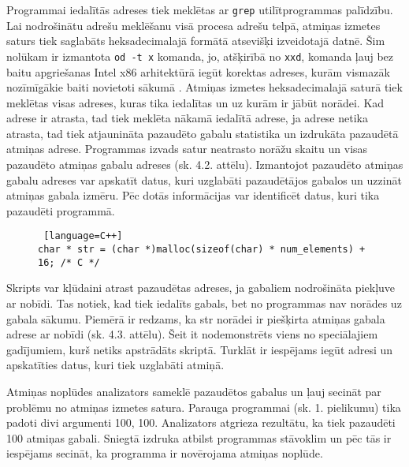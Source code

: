 Programmai iedalītās adreses tiek meklētas ar \texttt{grep} utilītprogrammas palīdzību.
Lai nodrošinātu adrešu meklēšanu visā procesa adrešu telpā, atmiņas izmetes saturs tiek saglabāts heksadecimalajā formātā atsevišķi izveidotajā datnē.
Šim nolūkam ir izmantota \texttt{od -t x} komanda, jo, atšķirībā no \texttt{xxd}, komanda ļauj bez baitu apgriešanas Intel x86 arhitektūrā iegūt korektas adreses, kurām  vismazāk nozīmīgākie baiti novietoti sākumā \cite{DPT}.
Atmiņas izmetes heksadecimalajā saturā tiek meklētas visas adreses, kuras tika iedalītas un uz kurām ir jābūt norādei.
Kad adrese ir atrasta, tad tiek meklēta nākamā iedalītā adrese, ja adrese netika atrasta, tad tiek atjaunināta pazaudēto gabalu statistika un izdrukāta pazaudētā atmiņas adrese.
Programmas izvads satur neatrasto norāžu skaitu un visas pazaudēto atmiņas gabalu adreses (sk. 4.2. attēlu).
Izmantojot pazaudēto atmiņas gabalu adreses var apskatīt datus, kuri uzglabāti pazaudētājos gabalos un uzzināt atmiņas gabala izmēru.
Pēc dotās informācijas var identificēt datus, kuri tika pazaudēti programmā.


\begin{figure}[h]
\begin{lstlisting} [language=C++]
char * str = (char *)malloc(sizeof(char) * num_elements) + 16; /* C */
\end{lstlisting}
\caption{\textbf{\fontsize{11}{12}\selectfont {Speciālgadījums - procesa adrešu telpā nav norādes uz gabala sākumu}}}
\end{figure}


Skripts var kļūdaini atrast pazaudētas adreses, ja gabaliem nodrošināta piekļuve ar nobīdi.
Tas notiek, kad tiek iedalīts gabals, bet no programmas nav norādes uz gabala sākumu.
Piemērā ir redzams, ka str norādei ir piešķirta atmiņas gabala adrese ar nobīdi (sk. 4.3. attēlu).
Šeit it nodemonstrēts viens no speciālajiem gadījumiem, kurš netiks apstrādāts skriptā. 
Turklāt ir iespējams iegūt adresi un apskatīties datus, kuri tiek uzglabāti atmiņā.



Atmiņas noplūdes analizators sameklē pazaudētos gabalus un ļauj secināt par problēmu no atmiņas izmetes satura.
Parauga programmai (sk. 1. pielikumu) tika padoti divi argumenti 100, 100. 
Analizators atgrieza rezultātu, ka tiek pazaudēti 100 atmiņas gabali.
Sniegtā izdruka atbilst programmas stāvoklim un pēc tās ir iespējams secināt, ka programma ir novērojama atmiņas noplūde.


